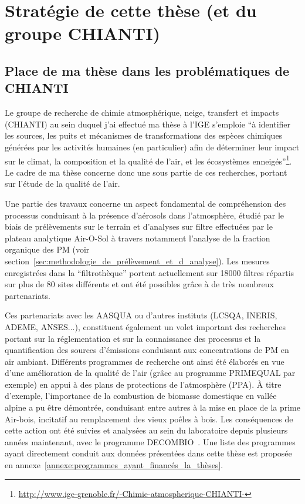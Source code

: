
\section{Stratégie de cette thèse (et du groupe CHIANTI)}%
\label{sec:stratégie__du_groupe_chianti}

\subsection{Place de ma thèse dans les problématiques de CHIANTI}%
\label{sub:place_de_ma_thèse_dans_les_problématiques_de_chianti}

Le groupe de recherche de chimie atmosphérique, neige, transfert et impacts (CHIANTI) au
sein duquel j'ai effectué ma thèse à l'IGE s'emploie ``à identifier les sources, les puits et
mécanismes de transformations des espèces chimiques générées par les activités humaines
(en particulier) afin de déterminer leur impact sur le climat, la composition et la
qualité de l’air, et les écosystèmes
enneigés''\footnote{\url{http://www.ige-grenoble.fr/-Chimie-atmospherique-CHIANTI-}}.
Le cadre de ma thèse concerne donc une sous partie de ces recherches, portant sur l'étude
de la qualité de l'air.

Une partie des travaux concerne un aspect fondamental de compréhension des processus
conduisant à la présence d'aérosols dans l'atmosphère, étudié par le biais de prélèvements sur le
terrain et d'analyses sur filtre effectuées par le plateau analytique Air-O-Sol à travers notamment
l'analyse de la fraction organique des PM (voir
section~\ref{sec:methodologie_de_prélèvement_et_d_analyse}).
Les mesures enregistrées dans la ``filtrothèque'' portent actuellement sur \num{18000}
filtres répartis sur plus de 80 sites différents et ont été possibles grâce à de très nombreux partenariats.

Ces partenariats avec les AASQUA ou d'autres instituts (LCSQA, INERIS, ADEME, ANSES...),
constituent également un volet important des recherches portant sur la réglementation et sur
la connaissance des processus et la quantification des sources d'émissions conduisant aux
concentrations de PM en air ambiant.
Différents programmes de recherche ont ainsi été élaborés en vue d'une amélioration de la
qualité de l'air (grâce au programme PRIMEQUAL par exemple) en appui à des plans de protections de
l'atmosphère (PPA). À titre d'exemple, l'importance
de la combustion de biomasse domestique en vallée alpine a pu être démontrée, conduisant
entre autres à la mise en place de la prime Air-bois, incitatif au remplacement des vieux
poêles à bois. Les conséquences de cette action ont été suivies et
analysées au sein du laboratoire depuis plusieurs années maintenant, avec le programme DECOMBIO~\autocite{chevrierDECOMBIOContribution2016,chevrierChauffage2016,allardQualite2018}.
Une liste des programmes ayant directement conduit aux données présentées dans cette thèse
est proposée en annexe~\ref{annexe:programmes_ayant_financés_la_thèses}.

